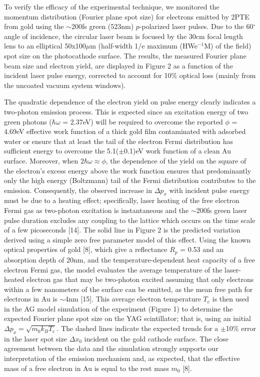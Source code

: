To verify the efficacy of the experimental technique, we monitored the momentum distribution (Fourier plane spot size) for electrons emitted by 2PTE from gold using the $\sim$200fs green (523nm) $p$-polarized laser pulses.
Due to the 60$^{\circ}$ angle of incidence, the circular laser beam is focused by the 30cm focal length lens to an elliptical 50x100$\mu$m (half-width 1/e maximum (HWe$^{-1}$M) of the field) spot size on the photocathode surface.
The results, the measured Fourier plane beam size and electron yield, are displayed in Figure 2 as a function of the incident laser pulse energy, corrected to account for 10\% optical loss (mainly from the uncoated vacuum system windows).

The quadratic dependence of the electron yield on pulse energy clearly indicates a two-photon emission process.
This is expected since an excitation energy of two green photons ($\hbar \omega$ = 2.37eV) will be required to overcome the reported $\phi$ = 4.69eV effective work function of a thick gold film contaminated with adsorbed water\cite{monjushiro_ultraviolet_1991} or ensure that at least the tail of the electron Fermi distribution has sufficient energy to overcome the 5.1($\pm$0.1)eV work function of a clean Au surface\cite{eastman_photoelectric_1970}.
Moreover, when $2\hbar \omega \approx \phi$, the dependence of the yield on the square of the electron's excess energy above the work function\cite{monjushiro_ultraviolet_1991} ensures that predominantly only the high energy (Boltzmann) tail of the Fermi distribution contributes to the emission.
Consequently, the observed increase in $\Delta p_x$ with incident pulse energy must be due to a heating effect; specifically, laser heating of the free electron Fermi gas as two-photon excitation is instantaneous and the $\sim$200fs green laser pulse duration excludes any coupling to the lattice which occurs on the time scale of a few picoseconds [14].
The solid line in Figure 2 is the predicted variation derived using a simple zero free parameter model of this effect.
Using the known optical properties of gold [8], which give a reflectance $R_p$ = 0.53 and an absorption depth of 20nm, and the temperature-dependent heat capacity of a free electron Fermi gas, the model evaluates the average temperature of the laser-heated electron gas that may be two-photon excited assuming that only electrons within a few nanometers of the surface can be emitted, as the mean free path for electrons in Au is $\sim$4nm [15].
This average electron temperature $T_e$ is then used in the AG model simulation of the experiment (Figure 1) to determine the expected Fourier plane spot size on the YAG scintillator; that is, using an initial $\Delta p_x = \sqrt{m_0 k_B T_e}$.  The dashed lines indicate the expected trends for a $\pm$10\% error in the laser spot size $\Delta x_0$ incident on the gold cathode surface.
The close agreement between the data and the simulation strongly supports our interpretation of the emission mechanism and, as expected, that the effective mass of a free electron in Au is equal to the rest mass $m_0$ [8].


